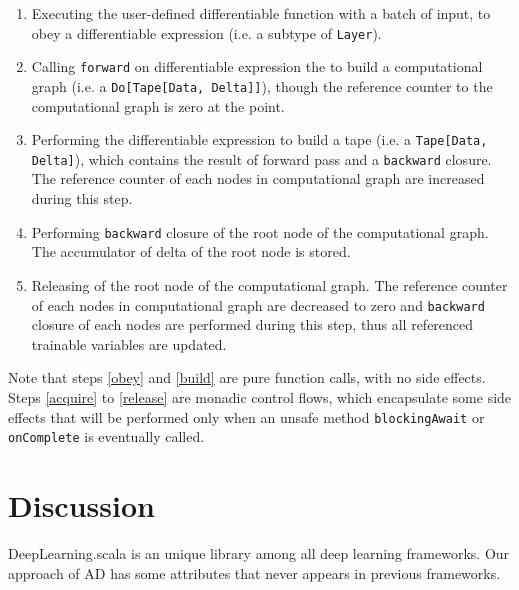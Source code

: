 \begin{enumerate}
  \item Executing the user-defined \gls{differentiable function} with a batch of input, to obey a \gls{differentiable expression} (i.e. a subtype of \lstinline{Layer}).
  \label{obey}
  
  \item Calling \lstinline{forward} on \gls{differentiable expression} the to build a \gls{computational graph} (i.e. a \lstinline{Do[Tape[Data, Delta]]}), though the reference counter to the \gls{computational graph} is zero at the point.
  \label{build}
  
  \item Performing the \gls{differentiable expression} to build a tape (i.e. a \lstinline{Tape[Data, Delta]}), which contains the result of forward pass and a \lstinline{backward} closure. The reference counter of each nodes in \gls{computational graph} are increased during this step.
  \label{acquire}

  \item Performing \lstinline{backward} closure of the root node of the \gls{computational graph}. The accumulator of delta of the root node is stored.

  \item Releasing of the root node of the \gls{computational graph}. The reference counter of each nodes in \gls{computational graph} are decreased to zero and \lstinline{backward} closure of each nodes are performed during this step, thus all referenced \glspl{trainable variable} are updated.
  \label{release}

\end{enumerate}

Note that steps \ref{obey} and \ref{build} are pure function calls, with no side effects. Steps \ref{acquire} to \ref{release} are monadic control flows, which encapsulate some side effects that will be performed only when an unsafe method \lstinline{blockingAwait} or \lstinline{onComplete} is eventually called.


\section{Discussion}

DeepLearning.scala is an unique library among all deep learning frameworks. Our approach of AD has some attributes that never appears in previous frameworks.

